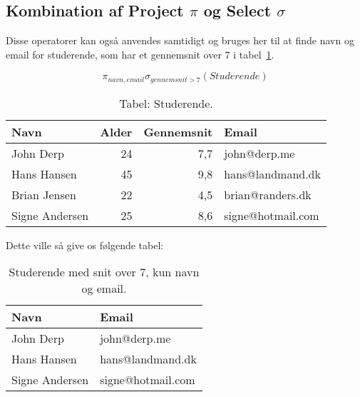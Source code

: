 \subsection{Kombination af Project $\pi$ og Select $\sigma$}

Disse operatorer kan også anvendes samtidigt og bruges her til at finde navn og email for studerende, som har et gennemsnit over 7 i tabel~\ref{tab:stud}.

\begin{equation}
\pi_{navn, email}\sigma_{gennemsnit>7}(Studerende)
\end{equation}

\begin{table}[H]
	\centering
	\begin{tabular}{lrrl}
		\toprule
		\textbf{Navn}	&\textbf{Alder}	&\textbf{Gennemsnit}&\textbf{Email}\\
		\midrule
		John Derp		& 24 			& 7,7	& john@derp.me			\\			
		Hans Hansen		& 45 			& 9,8	& hans@landmand.dk		\\			
		Brian Jensen	& 22 			& 4,5	& brian@randers.dk		\\			
		Signe Andersen	& 25 			& 8,6	& signe@hotmail.com		\\
		\bottomrule
	\end{tabular}
	\caption{Tabel: Studerende.}
	\label{tab:stud}
\end{table}

Dette ville så give os følgende tabel:

\begin{table}[H]
	\centering
	\begin{tabular}{ll}
		\toprule
		\textbf{Navn}	& \textbf{Email}	\\
		\midrule
		John Derp		& john@derp.me		\\			
		Hans Hansen		& hans@landmand.dk	\\			
		Signe Andersen	& signe@hotmail.com	\\
		\bottomrule
	\end{tabular}
	\caption{Studerende med snit over 7, kun navn og email.}
\end{table}